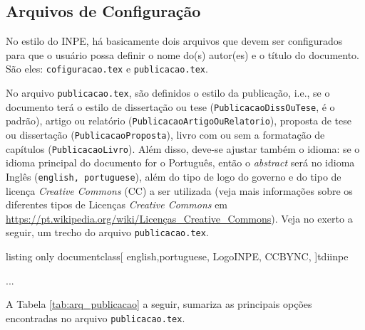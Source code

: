 \subsection{Arquivos de Configuração}
\label{sec:configura}

No estilo do INPE, há basicamente dois arquivos que devem ser configurados para que o usuário possa definir o nome do(s) autor(es) e o título do documento. São eles: {\tt cofiguracao.tex} e {\tt publicacao.tex}.

No arquivo {\tt publicacao.tex}, são definidos o estilo da publicação, i.e., se o documento terá o estilo de dissertação ou tese ({\tt PublicacaoDissOuTese}, é o padrão), artigo ou relatório ({\tt PublicacaoArtigoOuRelatorio}), proposta de tese ou dissertação ({\tt PublicacaoProposta}), livro com ou sem a formatação de capítulos ({\tt PublicacaoLivro}). Além disso, deve-se ajustar também o idioma: se o idioma principal do documento for o Português, então o \textit{abstract} será no idioma Inglês ({\tt english, portuguese}), além do tipo de logo do governo e do tipo de licença \textit{Creative Commons} (CC) a ser utilizada (veja mais informações sobre os diferentes tipos de Licenças \textit{Creative Commons} em \url{https://pt.wikipedia.org/wiki/Licenças_Creative_Commons}). Veja no exerto a seguir, um trecho do arquivo {\tt publicacao.tex}.

\begin{texexp}{listing only}
documentclass[
english,portuguese, 
LogoINPE,
CCBYNC,
]{tdiinpe}


...
\end{texexp}

A Tabela \ref{tab:arq_publicacao} a seguir, sumariza as principais opções encontradas no arquivo {\tt publicacao.tex}.

